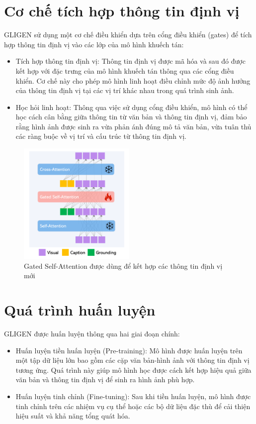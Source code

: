 \documentclass[12pt]{report}
\begin{document}
\section{Cơ chế tích hợp thông tin định vị}
GLIGEN sử dụng một cơ chế điều khiển dựa trên cổng điều khiển (gates)
để tích hợp thông tin định vị vào các lớp của mô hình khuếch tán:
\begin{itemize}
	\item Tích hợp thông tin định vị:
	      Thông tin định vị được mã hóa và sau đó được kết hợp với đặc trưng của mô hình
	      khuếch tán thông qua các cổng điều khiển.
	      Cơ chế này cho phép mô hình linh hoạt điều chỉnh mức độ ảnh hưởng của thông tin định vị
	      tại các vị trí khác nhau trong quá trình sinh ảnh.
	\item Học hỏi linh hoạt: Thông qua việc sử dụng cổng điều khiển,
	      mô hình có thể học cách cân bằng giữa thông tin từ văn bản và thông tin định vị,
	      đảm bảo rằng hình ảnh được sinh ra vừa phản ánh đúng mô tả văn bản,
	      vừa tuân thủ các ràng buộc về vị trí và cấu trúc từ thông tin định vị.
\end{itemize}

\begin{figure}[ht]
	\begin{center}
		\includegraphics[width=0.5\textwidth]{GatedSelfAttention.png}
		\caption{Gated Self-Attention được dùng để kết hợp các thông tin định vị mới}\label{fig:GatedSelfAttention}
	\end{center}
\end{figure}

\section{Quá trình huấn luyện}
GLIGEN được huấn luyện thông qua hai giai đoạn chính:
\begin{itemize}
	\item Huấn luyện tiền huấn luyện (Pre-training):
	      Mô hình được huấn luyện trên một tập dữ liệu lớn bao gồm các cặp văn bản-hình ảnh
	      với thông tin định vị tương ứng.
	      Quá trình này giúp mô hình học được cách kết hợp hiệu quả giữa văn bản
	      và thông tin định vị để sinh ra hình ảnh phù hợp.
	\item Huấn luyện tinh chỉnh (Fine-tuning):
	      Sau khi tiền huấn luyện, mô hình được tinh chỉnh trên các nhiệm vụ cụ thể
	      hoặc các bộ dữ liệu đặc thù để cải thiện hiệu suất và khả năng tổng quát hóa.
\end{itemize}
\end{document}
